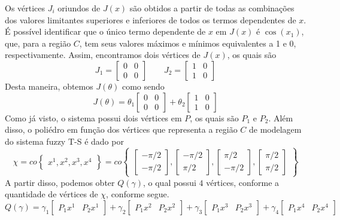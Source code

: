 Os vértices $J_i$ oriundos de $J(x)$ são obtidos a partir de todas as combinações dos valores limitantes superiores e inferiores de todos os termos dependentes de $x$. É possível identificar que o único termo dependente de $x$ em $J(x)$ é $\cos(x_1)$, que, para a região $C$, tem seus valores máximos e mínimos equivalentes a 1 e 0, respectivamente. Assim, encontramos dois vértices de $J(x)$, os quais são
\begin{equation*}
J_1 = \begin{bmatrix}0&0\\0&0\end{bmatrix}\qquad J_2 = \begin{bmatrix}1&0\\1&0\end{bmatrix}
\end{equation*}
Desta maneira, obtemos $J(\theta)$ como sendo
\begin{equation*}
J(\theta) = \theta_1\begin{bmatrix}0&0\\0&0\end{bmatrix} + \theta_2\begin{bmatrix}1&0\\1&0\end{bmatrix}
\end{equation*}
Como já visto, o sistema possui dois vértices em $P$, os quais são $P_1$ e $P_2$. Além disso, o poliédro em função dos vértices que representa a região $C$ de modelagem do sistema fuzzy T-S é dado por
\begin{equation*}
\chi = co\begin{Bmatrix}x^1,x^2,x^3,x^4\end{Bmatrix} = co\begin{Bmatrix}
\begin{bmatrix}-\pi/2\\-\pi/2\end{bmatrix},\begin{bmatrix}-\pi/2\\\pi/2\end{bmatrix},\begin{bmatrix}\pi/2\\-\pi/2\end{bmatrix},\begin{bmatrix}\pi/2\\\pi/2\end{bmatrix}
\end{Bmatrix}
\end{equation*}
A partir disso, podemos obter $Q(\gamma)$, o qual possui $4$ vértices, conforme a quantidade de vértices de $\chi$, conforme segue.
\begin{equation*}
Q(\gamma) = \gamma_1\begin{bmatrix}P_1x^1&P_2x^1\end{bmatrix}+\gamma_2\begin{bmatrix}P_1x^2&P_2x^2\end{bmatrix}+\gamma_3\begin{bmatrix}P_1x^3&P_2x^3\end{bmatrix}+\gamma_4\begin{bmatrix}P_1x^4&P_2x^4\end{bmatrix}
\end{equation*}

